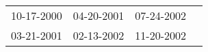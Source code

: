 \begin{supertabular}{llll}
 10-17-2000 &  04-20-2001 &  07-24-2002 \\
 03-21-2001 &  02-13-2002 &  11-20-2002 \\
\end{supertabular}
